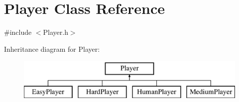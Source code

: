 \hypertarget{class_player}{}\section{Player Class Reference}
\label{class_player}


{\ttfamily \#include $<$Player.\+h$>$}

Inheritance diagram for Player\+:\begin{figure}[H]
\begin{center}
\leavevmode
\includegraphics[height=2.000000cm]{class_player}
\end{center}
\end{figure}
